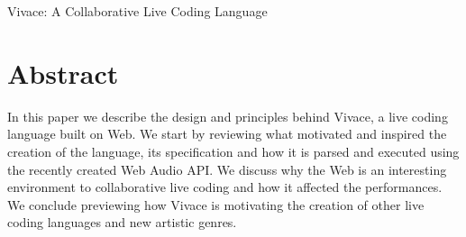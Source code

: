 \documentclass[letterpaper, 12pt]{article}
\begin{document}

\vspace*{24pt}
\vspace*{24pt}
 {\cmjTitle Vivace: A Collaborative Live Coding Language}
\section*{Abstract}
In this paper we describe the design and principles behind Vivace, a live coding language built on Web. We start by reviewing what motivated and inspired the creation of the language, its specification and how it is parsed and executed using the recently created Web Audio API. We discuss why the Web is an interesting environment to collaborative live coding and how it affected the performances. We conclude previewing how Vivace is motivating the creation of other live coding languages and new artistic genres.
\end{document}
